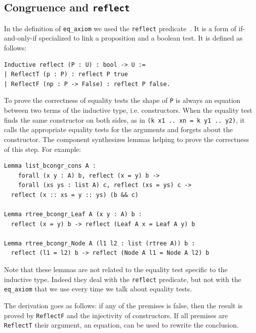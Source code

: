 \documentclass[sigplan,10pt,review]{acmart}\settopmatter{printfolios=true,printccs=false,printacmref=false}
\newcommand{\derive}[1]{\keys{#1}}
\begin{document}
\subsection{Congruence and \lstinline+reflect+} %
\label{sec:reflect}

In the definition of \lstinline+eq_axiom+ we used the \lstinline+reflect+
predicate~\cite{mcb}. It is a form of if-and-only-if specialized to link a
proposition and a boolean test. It is defined as follows:

\begin{minipage}{\textwidth}\begin{lstlisting}
Inductive reflect (P : U) : bool -> U :=
| ReflectT (p : P) : reflect P true
| ReflectF (np : P -> False) : reflect P false.
\end{lstlisting}\end{minipage}

\noindent
To prove the correctness of equality tests the shape of
\lstinline+P+ is always an equation between two terms of
the inductive type, i.e. constructors.
When the equality test finds the same constructor on both sides, as in
\lstinline+(k x1 .. xn = k y1 .. y2)+, it
calls the appropriate equality tests for the arguments and forgets about
the constructor. The \derive{bcongr} component synthesizes lemmas
helping to prove the correctness of this step. For example:

\begin{minipage}{\textwidth}\begin{lstlisting}
Lemma list_bcongr_cons A :
    forall (x y : A) b, reflect (x = y) b ->
    forall (xs ys : list A) c, reflect (xs = ys) c ->
  reflect (x :: xs = y :: ys) (b && c)

Lemma rtree_bcongr_Leaf A (x y : A) b :
  reflect (x = y) b -> reflect (Leaf A x = Leaf A y) b

Lemma rtree_bcongr_Node A (l1 l2 : list (rtree A)) b :
  reflect (l1 = l2) b -> reflect (Node A l1 = Node A l2) b
\end{lstlisting}\end{minipage}

\noindent
Note that these lemmas are not related to the
equality test specific to the inductive type. Indeed they deal
with the \lstinline+reflect+ predicate, but not with the
\lstinline+eq_axiom+ that we use every time we talk about equality tests.

The derivation goes as follows: if any of the premises
is false, then the result is proved by
\lstinline+ReflectF+ and the injectivity of constructors.
If all premises are \lstinline+ReflectT+ their argument,
an equation, can be used to rewrite the conclusion.
\end{document}
